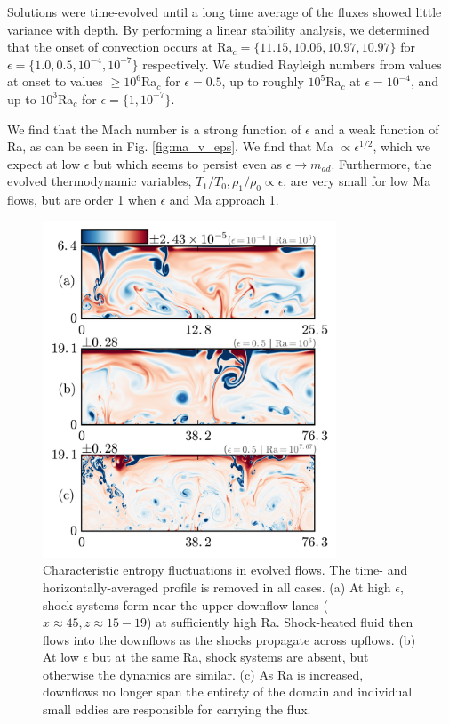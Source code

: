 \documentclass[aps, prl, twocolumn, nofootinbib, groupedaddress, amsfonts, amssymb, amsmath]{revtex4-1}
\begin{document}
Solutions were time-evolved until a long time average of the fluxes
showed little
variance with depth. By performing a linear stability analysis, 
we determined that the onset of convection
occurs at $\text{Ra}_c = \{11.15, 10.06, 10.97, 10.97\}$ for $\epsilon = \{1.0, 0.5, 10^{-4}, 10^{-7}\}$ respectively.  
We studied Rayleigh
numbers from values at onset to values $\geq 10^6$Ra$_c$ for $\epsilon = 0.5$, up to
roughly $10^5$Ra$_c$ at $\epsilon = 10^{-4}$, and 
up to $10^3$Ra$_c$ for $\epsilon = \{1, 10^{-7}\}$.

We find that the Mach number is a strong function of $\epsilon$ and a weak function of 
Ra, as can be seen in Fig. \ref{fig:ma_v_eps}.  We find that Ma $\propto \epsilon^{1/2}$,
which we expect at low $\epsilon$ but which seems to persist even as $\epsilon \rightarrow m_{ad}$.
Furthermore, the evolved thermodynamic variables, $T_1/T_0, \rho_1/\rho_0 \propto \epsilon$,
are very small for low Ma flows, but are order 1 when $\epsilon$ and Ma approach 1.

\begin{figure}[t]
\includegraphics[width=3.4375in]{./figs/snapshots_fig.png}
\caption{Characteristic entropy fluctuations in evolved flows. 
The time- and horizontally-averaged profile is removed in all cases.  (a) At high
$\epsilon$, shock systems form near the upper downflow lanes ($x \approx 45, z \approx 15-19$)
at sufficiently high Ra.
Shock-heated fluid then flows into the downflows as the shocks propagate across upflows.
(b) At low $\epsilon$ but at the same Ra, shock systems are absent, 
but otherwise the dynamics are similar.  (c) As Ra is increased, downflows no longer span
the entirety of the domain and individual small eddies are responsible for carrying the flux.
\label{fig:entropy_snapshots} }
\end{figure}
\end{document}

